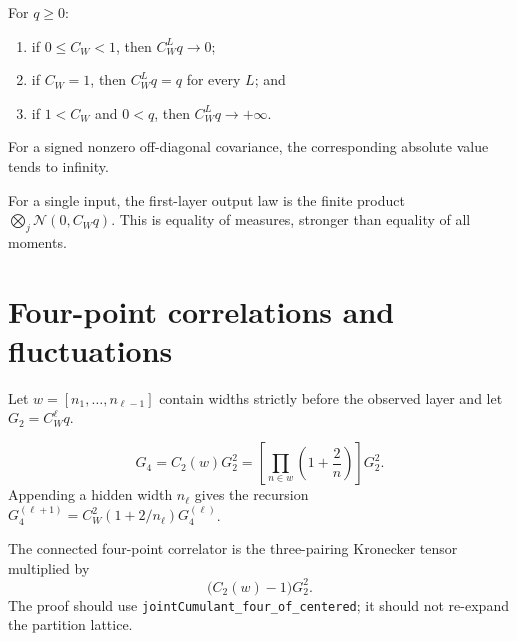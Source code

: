 \begin{theorem}
\label{thm:dln:criticality}
For $q\geq0$:
\begin{enumerate}
  \item if $0\leq C_W<1$, then $C_W^Lq\to0$;
  \item if $C_W=1$, then $C_W^Lq=q$ for every $L$; and
  \item if $1<C_W$ and $0<q$, then $C_W^Lq\to+\infty$.
\end{enumerate}
For a signed nonzero off-diagonal covariance, the corresponding absolute value tends to infinity.
\end{theorem}

\begin{corollary}
\label{cor:dln:firstLayerGaussian}
For a single input, the first-layer output law is the finite product
$\bigotimes_j\mathcal N(0,C_Wq)$.  This is equality of measures, stronger than equality of all
moments.
\end{corollary}

\section{Four-point correlations and fluctuations}

Let $w=[n_1,\ldots,n_{\ell-1}]$ contain widths strictly before the observed layer and let
$G_2=C_W^\ell q$.

\begin{corollary}
\label{cor:dln:fourPoint}
\[
 G_4=C_2(w)G_2^2
   =\left[\prod_{n\in w}\left(1+\frac2n\right)\right]G_2^2.
\]
Appending a hidden width $n_\ell$ gives the recursion
$G_4^{(\ell+1)}=C_W^2(1+2/n_\ell)G_4^{(\ell)}$.
\end{corollary}

\begin{corollary}
\label{cor:dln:connectedFour}
The connected four-point correlator is the three-pairing Kronecker tensor multiplied by
\[
 \big(C_2(w)-1\big)G_2^2.
\]
The proof should use \texttt{jointCumulant\_four\_of\_centered}; it should not re-expand the
partition lattice.
\end{corollary}


